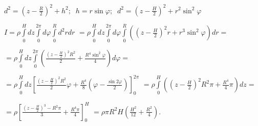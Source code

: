 \documentclass{report}
\begin{document}
$ d^2 = {\left( z - \frac{R}{2}\right)}^2 + h^2;\ $
$ h = r\sin{\varphi};\ $
$ d^2 = {\left( z - \frac{H}{2}\right)}^2 + r^2 \sin^2{\varphi} $

$ I = \rho\int\limits_{0}^{H}dz \int\limits_{0}^{2\pi} d\varphi \int\limits_{0}^{R} d^2r dr $
$ = \rho\int\limits_{0}^{H}dz \int\limits_{0}^{2\pi} d\varphi \int\limits_{0}^{R} \left({\left( z - \frac{H}{2}\right)}^2 r + r^3\sin^2\varphi \right) dr = $

$ = \rho\int\limits_{0}^{H}dz \int\limits_{0}^{2\pi} \left( \frac{{\left( z - \frac{H}{2}\right)}^2 R^2}{2} + 
\frac{R^4 \sin^2{\varphi}}{4} \right) d\varphi = $

$ = \rho\int\limits_{0}^{H}dz \left[ \frac{{\left( z - \frac{H}{2}\right)}^2 R^2}{2} \varphi + 
\frac{R^4}{8} \left(\varphi - \frac{\sin{2\varphi}}{2}\right) \right]_{0}^{2\pi} $
$ = \rho\int\limits_{0}^{H} \left( {\left( z - \frac{H}{2}\right)}^2 R^2 \pi + 
\frac{R^4}{4} \pi \right) dz = $

$ = \rho \left[\frac{{\left( z - \frac{H}{2}\right)}^3 - R^2 \pi}{3} + \frac{R^4 \pi}{4} \right]_{0}^{H} $
$ = \rho \pi R^2 H \left( \frac{H^2}{12} + \frac{R^2}{4} \right). $
\end{document}

